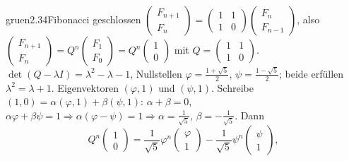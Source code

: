 \begin{loesungkarte}{gruen}{2.34}{Fibonacci geschlossen}
$\begin{pmatrix}F_{n+1}\\ F_n\end{pmatrix} = \begin{pmatrix}1 & 1\\ 1 & 0\end{pmatrix}\begin{pmatrix}F_n\\ F_{n-1}\end{pmatrix}$, also $\begin{pmatrix}F_{n+1}\\ F_n\end{pmatrix} = Q^{n}\begin{pmatrix}F_1\\ F_0\end{pmatrix} = Q^{n}\begin{pmatrix}1\\ 0\end{pmatrix}$ mit $Q = \begin{pmatrix}1 & 1\\ 1 & 0\end{pmatrix}$.
$\det(Q - \lambda I) = \lambda^{2} - \lambda - 1$, Nullstellen $\varphi = \frac{1 + \sqrt5}2$, $\psi = \frac{1 - \sqrt5}2$; beide erfüllen $\lambda^{2} = \lambda + 1$. Eigenvektoren $(\varphi, 1)$ und $(\psi, 1)$. Schreibe $(1, 0) = \alpha(\varphi, 1) + \beta(\psi, 1)$: $\alpha + \beta = 0$, $\alpha\varphi + \beta\psi = 1\Rightarrow\alpha(\varphi - \psi) = 1\Rightarrow\alpha = \frac1{\sqrt5}$, $\beta = -\frac1{\sqrt5}$. Dann
\[ Q^{n}\begin{pmatrix}1\\ 0\end{pmatrix} = \frac1{\sqrt5}\varphi^{n}\begin{pmatrix}\varphi\\ 1\end{pmatrix} - \frac1{\sqrt5}\psi^{n}\begin{pmatrix}\psi\\ 1\end{pmatrix}, \]

\end{loesungkarte}

